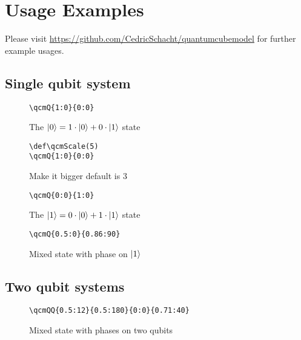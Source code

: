 \documentclass{article}
\begin{document}
\clearpage
\section*{Usage Examples}
Please visit \href{https://github.com/CedricSchacht/quantumcubemodel}{https://github.com/CedricSchacht/quantumcubemodel}
for further example usages.
\subsection*{Single qubit system}
\begin{figure}[!ht]
    \begin{verbatim}
\qcmQ{1:0}{0:0}
    \end{verbatim}
    \centering
    \caption{The $\ket{0} = 1 \cdot \ket{0} + 0 \cdot \ket{1}$ state}
\end{figure}

\begin{figure}[!ht]
    \begin{verbatim}
\def\qcmScale(5)
\qcmQ{1:0}{0:0}
    \end{verbatim}
    \centering
    \def\qcmScale{5}
    \caption{Make it bigger default is 3}
\end{figure}

\begin{figure}[!ht]
    \begin{verbatim}
\qcmQ{0:0}{1:0}
    \end{verbatim}
    \centering
    \caption{The $\ket{1} = 0 \cdot \ket{0} + 1 \cdot \ket{1}$ state}
\end{figure}

\begin{figure}[!ht]
    \begin{verbatim}
\qcmQ{0.5:0}{0.86:90}
    \end{verbatim}
    \centering
    \caption{Mixed state with phase on $\ket{1}$}
\end{figure}

\pagebreak
\subsection*{Two qubit systems}
\begin{figure}[!ht]
    \begin{verbatim}
\qcmQQ{0.5:12}{0.5:180}{0:0}{0.71:40}
    \end{verbatim}
    \centering
    \caption{Mixed state with phases on two qubits}
\end{figure}
\end{document}
